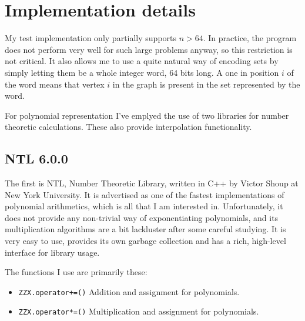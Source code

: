 \documentclass[a4paper]{article}
\newcommand{\code}{\texttt}
\begin{document}
\section{Implementation details}
My test implementation only partially supports $n > 64$. In practice, the program does not perform very well for such large problems anyway, so this restriction is not critical. It also allows me to use a quite natural way of encoding sets by simply letting them be a whole integer word, 64 bits long. A one in position $i$ of the word means that vertex $i$ in the graph is present in the set represented by the word.



For polynomial representation I've emplyed the use of two libraries for number theoretic calculations. These also provide interpolation functionality.


\subsection{NTL 6.0.0}
The first is NTL, Number Theoretic Library, written in C++ by Victor Shoup at New York University\cite{ntl}. It is advertised as one of the fastest implementations of polynomial arithmetics, which is all that I am interested in. Unfortunately, it does not provide any non-trivial way of exponentiating polynomials, and its multiplication algorithms are a bit lackluster after some careful studying. It is very easy to use, provides its own garbage collection and has a rich, high-level interface for library usage.

The functions I use are primarily these: 

\begin{itemize}
 \item \code{ZZX.operator+=()}
 \subitem Addition and assignment for polynomials. %
 \item \code{ZZX.operator*=()}
 \subitem Multiplication and assignment for polynomials. %
\end{itemize}
\end{document}

